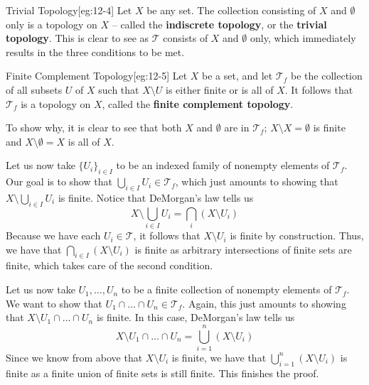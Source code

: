 \begin{egBox}{Trivial Topology}[eg:12-4]
    Let \( X \) be any set. The collection consisting of \( X \) and \( \emptyset \) only is a topology on \( X \) -- called the
    \textbf{indiscrete topology}, or the \textbf{trivial topology}. This is clear to see as \( \mathcal{T} \) consists of
    \( X \) and \( \emptyset \) only, which immediately results in the three conditions to be met.
\end{egBox}

\begin{egBox}{Finite Complement Topology}[eg:12-5]
    Let \( X \) be a set, and let \( \mathcal{T}_{ f } \) be the collection of 
    all subsets \( U \) of \( X \) such that \( X \setminus U \) is either 
    finite or is all of \( X \). 
    It follows that \( \mathcal{T}_{ f } \) is a topology on \( X \),
    called the \textbf{finite complement topology}.

    \baseSkip

    To show why, it is clear to see that both \( X \) and \( \emptyset \) are 
    in \( \mathcal{T}_{ f } \);
    \( X \setminus X = \emptyset \) is finite and 
    \( X \setminus \emptyset = X \) is all of \( X \).

    \baseSkip

    Let us now take
    \( \{ U_{ i } \}_{ i \in I } \) to be an indexed family of 
    nonempty elements of \( \mathcal{T}_{ f } \). Our
    goal is to show that 
    \( \bigcup_{ i \in I } U_{ i } \in \mathcal{T}_{ f } \), which just 
    amounts to showing that
    \( X \setminus \bigcup_{ i \in I } U_{ i } \) is finite. 
    Notice that DeMorgan's law tells us
    \begin{equation*}
        X \setminus \bigcup_{ i \in I } U_{ i } 
        = 
        \bigcap_{ i } ( X \setminus U_{ i } )
    \end{equation*}
    Because we have each \( U_{ i } \in \mathcal{T} \), it follows that \( X 
    \setminus U_{ i } \) is finite by construction.
    Thus, we
    have that \( \bigcap_{ i \in I } ( X \setminus U_{ i } ) \) is finite as 
    arbitrary intersections of finite sets are finite,
    which takes care of the second condition.

    \baseSkip
    
    Let us now take \( U_{ 1 }, \ldots, U_{ n } \) to be a finite collection of 
    nonempty elements of \( \mathcal{T}_{ f } \).
    We want to show that \( U_{ 1 } \cap \ldots \cap U_{ n } \in 
    \mathcal{T}_{ f } \). Again, this just amounts to showing that
    \( X \setminus U_{ 1 } \cap \ldots \cap U_{ n } \) is finite. In this case, 
    DeMorgan's law tells us
    \begin{equation*}
        X \setminus U_{ 1 } \cap \ldots \cap U_{ n }
        =
        \bigcup_{ i = 1 }^{ n } ( X \setminus U_{ i } )
    \end{equation*}
    Since we know from above that \( X \setminus U_{ i } \) is finite, we have 
    that \( \bigcup_{ i = 1 }^{ n } ( X \setminus U_{ i } ) \)
    is finite as a finite union of finite sets is still finite. This finishes 
    the proof.
\end{egBox}

